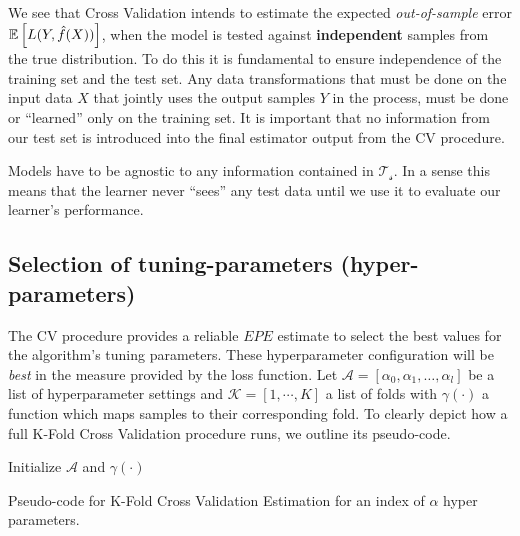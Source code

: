 We see that Cross Validation intends to estimate the expected \textit{out-of-sample} error $\operatorname{\mathbb{E}} \left[ L(Y, \hat{f}(X)) \right]$, when the model is tested against \textbf{independent} samples from the true distribution.
To do this it is fundamental to ensure independence of the training set and the test set.
Any data transformations that must be done on the input data $X$ that jointly uses the output samples $Y$ in the process, must be done or ``learned'' only on the training set.
It is important that no information from our test set is introduced into the final estimator output from the CV procedure.

Models have to be agnostic to any information contained in $\mathcal{T_s}$.
In a sense this means that the learner never ``sees'' any test data until we use it to evaluate our learner's performance.


\subsection{Selection of tuning-parameters (hyper-parameters) }\label{subsection:selection_hyper_params}

The CV procedure provides a reliable $EPE$ estimate to select the best values for the algorithm's tuning parameters.
These hyperparameter configuration will be \textit{best} in the measure provided by the loss function.
Let $\mathcal{A} = [\alpha_0, \alpha_1,\ldots, \alpha_l  ]$ be a list of hyperparameter settings and $\mathcal{K} =[1,\cdots ,K]$ a list of folds with $\gamma(\cdot)$ a function which maps samples to their corresponding fold.
To clearly depict how a full K-Fold Cross Validation procedure runs, we outline its pseudo-code.

 \begin{algorithm}[H]
 \SetAlgoLined{}
 Initialize $\mathcal{A}$ and $\gamma(\cdot)$\;
 \caption{Pseudo-code for K-Fold Cross Validation Estimation for an index of $\alpha$ hyper parameters.}
 \end{algorithm}


